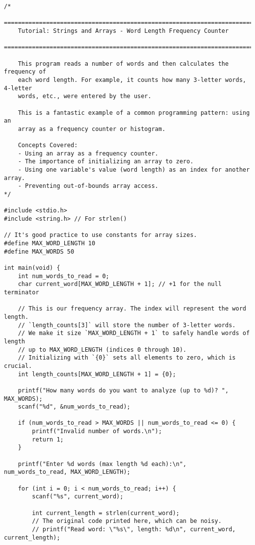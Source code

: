\documentclass[11pt]{book}
\begin{document}
\begin{verbatim}
/*
    ================================================================================
    Tutorial: Strings and Arrays - Word Length Frequency Counter
    ================================================================================

    This program reads a number of words and then calculates the frequency of
    each word length. For example, it counts how many 3-letter words, 4-letter
    words, etc., were entered by the user.

    This is a fantastic example of a common programming pattern: using an
    array as a frequency counter or histogram.

    Concepts Covered:
    - Using an array as a frequency counter.
    - The importance of initializing an array to zero.
    - Using one variable's value (word length) as an index for another array.
    - Preventing out-of-bounds array access.
*/

#include <stdio.h>
#include <string.h> // For strlen()

// It's good practice to use constants for array sizes.
#define MAX_WORD_LENGTH 10
#define MAX_WORDS 50

int main(void) {
    int num_words_to_read = 0;
    char current_word[MAX_WORD_LENGTH + 1]; // +1 for the null terminator

    // This is our frequency array. The index will represent the word length.
    // `length_counts[3]` will store the number of 3-letter words.
    // We make it size `MAX_WORD_LENGTH + 1` to safely handle words of length
    // up to MAX_WORD_LENGTH (indices 0 through 10).
    // Initializing with `{0}` sets all elements to zero, which is crucial.
    int length_counts[MAX_WORD_LENGTH + 1] = {0};

    printf("How many words do you want to analyze (up to %d)? ", MAX_WORDS);
    scanf("%d", &num_words_to_read);

    if (num_words_to_read > MAX_WORDS || num_words_to_read <= 0) {
        printf("Invalid number of words.\n");
        return 1;
    }

    printf("Enter %d words (max length %d each):\n", num_words_to_read, MAX_WORD_LENGTH);

    for (int i = 0; i < num_words_to_read; i++) {
        scanf("%s", current_word);

        int current_length = strlen(current_word);
        // The original code printed here, which can be noisy.
        // printf("Read word: \"%s\", length: %d\n", current_word, current_length);


\end{verbatim}
\end{document}
